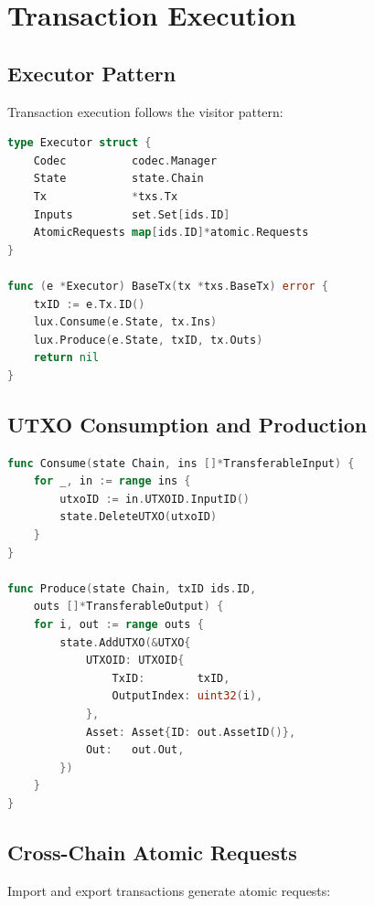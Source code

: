 \documentclass[11pt,a4paper]{article}
\begin{document}
\section{Transaction Execution}

\subsection{Executor Pattern}

Transaction execution follows the visitor pattern:

\begin{lstlisting}[language=Go,caption={Transaction Executor}]
type Executor struct {
    Codec          codec.Manager
    State          state.Chain
    Tx             *txs.Tx
    Inputs         set.Set[ids.ID]
    AtomicRequests map[ids.ID]*atomic.Requests
}

func (e *Executor) BaseTx(tx *txs.BaseTx) error {
    txID := e.Tx.ID()
    lux.Consume(e.State, tx.Ins)
    lux.Produce(e.State, txID, tx.Outs)
    return nil
}
\end{lstlisting}

\subsection{UTXO Consumption and Production}

\begin{lstlisting}[language=Go,caption={UTXO Operations}]
func Consume(state Chain, ins []*TransferableInput) {
    for _, in := range ins {
        utxoID := in.UTXOID.InputID()
        state.DeleteUTXO(utxoID)
    }
}

func Produce(state Chain, txID ids.ID,
    outs []*TransferableOutput) {
    for i, out := range outs {
        state.AddUTXO(&UTXO{
            UTXOID: UTXOID{
                TxID:        txID,
                OutputIndex: uint32(i),
            },
            Asset: Asset{ID: out.AssetID()},
            Out:   out.Out,
        })
    }
}
\end{lstlisting}

\subsection{Cross-Chain Atomic Requests}

Import and export transactions generate atomic requests:
\end{document}
